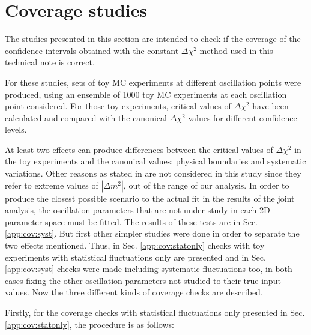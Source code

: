 \clearpage

\section{Coverage studies}
\label{app:coverage}

The studies presented in this section are intended to check if the coverage of the confidence intervals
obtained with the constant $\Delta\chi^{2}$ method used in this technical note is correct.

For these studies, sets of toy MC experiments at different oscillation points were produced, 
using an ensemble of 1000 toy MC experiments at each oscillation point considered.
For those toy experiments, critical values of $\Delta\chi^{2}$
have been calculated and compared with the canonical $\Delta\chi^{2}$ values for different confidence levels. 

At least two effects can produce differences between the critical values of $\Delta\chi^{2}$ in the toy experiments and the canonical values: physical boundaries and systematic variations. Other reasons as stated in \cite{FeldmanCousins} are not considered in this study since they refer to extreme values of $|\Delta m^{2}|$, out of the range of our analysis. 
In order to produce the closest possible scenario to the actual fit in the results of the joint analysis, the oscillation parameters that are not under study in each 2D parameter space must be fitted. The results of these tests are in Sec.\ref{app:cov:syst}.
But first other simpler studies were done in order to separate the two effects mentioned. Thus, in Sec. \ref{app:cov:statonly} checks with toy experiments with statistical fluctuations only are presented and in Sec.\ref{app:cov:syst} checks were made including systematic fluctuations too, in both cases fixing the other oscillation parameters not studied to their true input values. 
Now the three different kinds of coverage checks are described.

Firstly, for the coverage checks with statistical fluctuations only presented in Sec. \ref{app:cov:statonly}, the procedure is as follows:

